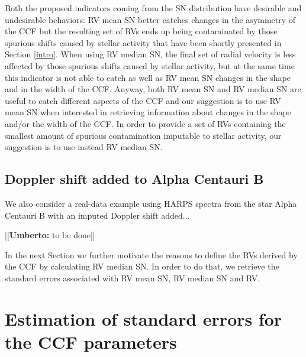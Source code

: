 \documentclass[11pt, oneside]{article}
\newcommand{\umberto}[1]{{\color{green}[[\textbf{Umberto: }#1]]}}
\begin{document}
{Both the proposed indicators coming from the SN distribution have desirable and undesirable behaviors: RV mean SN better catches changes in the asymmetry of the CCF but the resulting set of RVs ends up being contaminated by those spurious shifts caused by stellar activity that have been shortly presented in Section \ref{intro}. When using RV median SN, the final set of radial velocity is less affected by those spurious shifts caused by stellar activity, but at the same time this indicator is not able to catch as well as RV mean SN changes in the shape and in the width of the CCF. Anyway, both RV mean SN and RV median SN are useful to catch different aspects of the CCF and our suggestion is to use RV mean SN when interested in retrieving information about changes in the shape and/or the width of the CCF. In order to provide a set of RVs containing the smallest amount of spurious contamination imputable to stellar activity, our suggestion is to use instead RV median SN. 

\subsection{Doppler shift added to Alpha Centauri B} \label{sec:soap_real}

We also consider a real-data example using HARPS spectra from the star Alpha Centauri B with an imputed Doppler shift added...

\umberto{to be done}

In the next Section we further motivate the reasons to define the RVs derived by the CCF by calculating RV median SN. In order to do that, we retrieve the standard errors associated with RV mean SN, RV median SN and RV.

\section{Estimation of standard errors for the CCF parameters} \label{sec:5}

}
\end{document}
